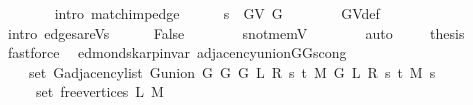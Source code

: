 \begin{isabellebody}
\ \ \ \ \ \ \isamarkupfalse%
\ {\isacharparenleft}{\kern0pt}intro\ match{\isacharunderscore}{\kern0pt}imp{\isacharunderscore}{\kern0pt}edge{\isacharparenright}{\kern0pt}\isanewline
\ \ \ \ \isamarkupfalse%
\ {\isachardoublequoteopen}s\ {\isasymin}\ G{\isachardot}{\kern0pt}V\ G{\isachardoublequoteclose}\isanewline
\ \ \ \ \ \ \isamarkupfalse%
\ G{\isachardot}{\kern0pt}V{\isacharunderscore}{\kern0pt}def\isanewline
\ \ \ \ \ \ \isamarkupfalse%
\ {\isacharparenleft}{\kern0pt}intro\ edges{\isacharunderscore}{\kern0pt}are{\isacharunderscore}{\kern0pt}Vs{\isacharparenright}{\kern0pt}\isanewline
\ \ \ \ \isamarkupfalse%
\ False\isanewline
\ \ \ \ \ \ \isamarkupfalse%
\ s{\isacharunderscore}{\kern0pt}not{\isacharunderscore}{\kern0pt}mem{\isacharunderscore}{\kern0pt}V\isanewline
\ \ \ \ \ \ \isamarkupfalse%
\ auto\ \isacommand{{\isacharbraceright}{\kern0pt}}\isamarkupfalse%
\isanewline
\ \ \isamarkupfalse%
\ {\isacharquery}{\kern0pt}thesis\isanewline
\ \ \ \ \isamarkupfalse%
\ fastforce\isanewline
{}\isamarkupfalse%
%
\endisatagproof
{\isafoldproof}%
%
\isadelimproof
\isanewline
%
\endisadelimproof
%
\isadeliminvisible
\isanewline
%
\endisadeliminvisible
%
\isataginvisible
{}\isamarkupfalse%
\ {\isacharparenleft}{\kern0pt}\ edmonds{\isacharunderscore}{\kern0pt}karp{\isacharunderscore}{\kern0pt}invar{\isacharparenright}{\kern0pt}\ adjacency{\isacharunderscore}{\kern0pt}union{\isacharunderscore}{\kern0pt}G{}{\isacharunderscore}{\kern0pt}G{}{\isacharunderscore}{\kern0pt}s{\isacharunderscore}{\kern0pt}cong{\isacharcolon}{\kern0pt}\isanewline
\ \ \isanewline
\ \ \ \ {\isachardoublequoteopen}set\ {\isacharparenleft}{\kern0pt}G{\isachardot}{\kern0pt}adjacency{\isacharunderscore}{\kern0pt}list\ {\isacharparenleft}{\kern0pt}G{\isachardot}{\kern0pt}union\ {\isacharparenleft}{\kern0pt}G{}\ G\ {\isacharparenleft}{\kern0pt}G{}\ L\ R\ s\ t\ M{\isacharparenright}{\kern0pt}{\isacharparenright}{\kern0pt}\ {\isacharparenleft}{\kern0pt}G{}\ L\ R\ s\ t\ M{\isacharparenright}{\kern0pt}{\isacharparenright}{\kern0pt}\ s{\isacharparenright}{\kern0pt}\ {\isacharequal}{\kern0pt}\isanewline
\ \ \ \ \ set\ {\isacharparenleft}{\kern0pt}free{\isacharunderscore}{\kern0pt}vertices\ L\ M{\isacharparenright}{\kern0pt}{\isachardoublequoteclose}%
\endisataginvisible
{\isafoldinvisible}%
%
\isadeliminvisible
\isanewline
%
\endisadeliminvisible

\end{isabellebody}
